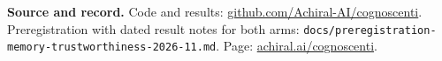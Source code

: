 \documentclass[10pt,a4paper]{article}
\begin{document}
\textbf{Source and record.} Code and results: \href{https://github.com/Achiral-AI/cognoscenti}{github.com/Achiral-AI/cognoscenti}. Preregistration with dated result notes for both arms: \texttt{docs/preregistration-memory-trustworthiness-2026-11.md}. Page: \href{https://achiral.ai/cognoscenti}{achiral.ai/cognoscenti}.
\end{document}
